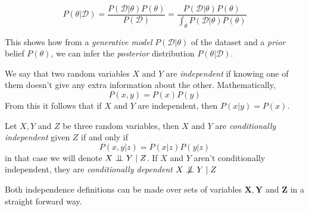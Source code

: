 \[
P(\theta|\mathcal{D}) = \frac{P(\mathcal{D}|\theta)P(\theta)}{P(\mathcal{D})} =
\frac{P(\mathcal{D}|\theta)P(\theta)}{ \int_{\theta} P(\mathcal{D}|\theta)P(\theta)}
\]

This shows how from a \emph{generative model} \(P(\mathcal{D}|\theta)\) of the dataset
and a \emph{prior} belief \(P(\theta)\), we can infer the \emph{posterior} distribution
\(P(\theta|\mathcal{D})\). \\

\begin{definition}
We say that two random variables \(X\) and \(Y\) are \emph{independent} if knowing one of them doesn't give any extra information about the other. Mathematically,
\[
P(x,y) = P(x)P(y)
\]
From this it follows that if \(X\) and \(Y\) are independent, then \(P(x|y) = P(x)\).
\end{definition}


\begin{definition}
Let \(X,Y\) and \(Z\) be three random variables, then \(X\) and \(Y\) are
\emph{conditionally independent} given \(Z\) if and only if
\[
P(x,y | z) = P(x|z)P(y|z)
\]
in that case we will denote \(X \bigCI Y \mid Z\). If \(X\) and \(Y\) aren't
conditionally independent, they are \emph{conditionally dependent} \(X \bigCD Y \mid Z\)

\end{definition}

Both independence definitions can be made over sets of variables \(\bm{X},
\bm{Y}\) and \(\bm{Z}\) in a straight forward way.

